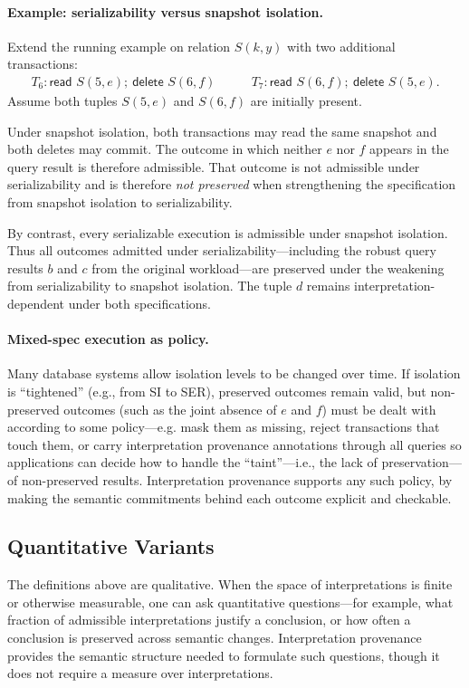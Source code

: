 \documentclass[acmsmall,nonacm]{acmart}
\theoremstyle{remark}
\numberwithin{definition}{section}
\numberwithin{theorem}{section}
\numberwithin{lemma}{section}
\numberwithin{corollary}{section}
\numberwithin{remark}{section}
\numberwithin{example}{section}
\numberwithin{observation}{section}
\numberwithin{assumption}{section}
\begin{document}
\paragraph{Example: serializability versus snapshot isolation.}
Extend the running example on relation $S(k,y)$ with two additional transactions:
\[
\begin{array}{ll}
T_6: \textsf{read } S(5,e);\ \textsf{delete } S(6,f) \qquad &
T_7: \textsf{read } S(6,f);\ \textsf{delete } S(5,e).
\end{array}
\]
Assume both tuples $S(5,e)$ and $S(6,f)$ are initially present.

Under snapshot isolation, both transactions may read the same snapshot and both
deletes may commit.
The outcome in which neither $e$ nor $f$ appears in the query result is therefore
admissible.
That outcome is not admissible under serializability and is therefore
\emph{not preserved} when strengthening the specification from snapshot isolation
to serializability.

By contrast, every serializable execution is admissible under snapshot isolation.
Thus all outcomes admitted under serializability—including the robust query
results $b$ and $c$ from the original workload—are preserved under the weakening
from serializability to snapshot isolation.
The tuple $d$ remains interpretation-dependent under both specifications.

\paragraph{Mixed-spec execution as policy.}
Many database systems allow isolation levels to be changed over time.
If isolation is ``tightened'' (e.g., from SI to SER), preserved outcomes remain valid, but
non-preserved outcomes (such as the joint absence of $e$ and $f$) must be dealt with according
to some policy---e.g. mask them as missing, reject transactions that touch them, or
carry interpretation provenance annotations through all queries so applications can decide how
to handle the ``taint''—i.e., the lack of preservation—of non-preserved results.
Interpretation provenance supports any such policy, by making the semantic commitments
behind each outcome explicit and checkable.

\subsection{Quantitative Variants}

The definitions above are qualitative.
When the space of interpretations is finite or otherwise measurable, one can ask
quantitative questions—for example, what fraction of admissible interpretations
justify a conclusion, or how often a conclusion is preserved across semantic
changes.
Interpretation provenance provides the semantic structure needed to formulate such
questions, though it does not require a measure over interpretations.
\end{document}
